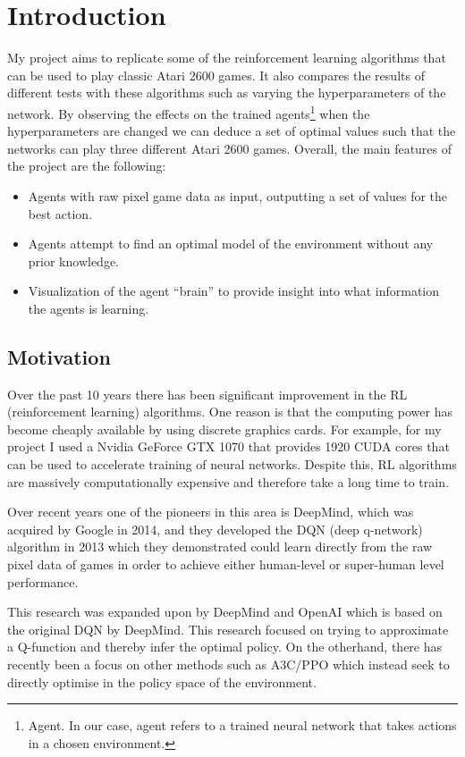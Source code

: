 \chapter{Introduction}
\label{cha:intro}
My project aims to replicate some of the reinforcement learning algorithms that can be used to play classic Atari 2600 games. It also compares the results of different tests with these algorithms such as varying the hyperparameters of the network. By observing the effects on the trained agents\footnote{Agent. In our case, agent refers to a trained neural network that takes actions in a chosen environment.} when the hyperparameters are changed we can deduce a set of optimal values such that the networks can play three different Atari 2600 games. Overall, the main features of the project are the following:
\begin{itemize}
	\item Agents with raw pixel game data as input, outputting a set of values for the best action.
	\item Agents attempt to find an optimal model of the environment without any prior knowledge.
	\item Visualization of the agent ``brain'' to provide insight into what information the agents is learning.
\end{itemize}

\section{Motivation}
\label{sec:moti}
Over the past 10 years there has been significant improvement in the RL (reinforcement learning) algorithms. One reason is that the computing power has become cheaply available by using discrete graphics cards. For example, for my project I used a Nvidia GeForce GTX 1070 that provides 1920 CUDA cores that can be used to accelerate training of neural networks. Despite this, RL algorithms are massively computationally expensive and therefore take a long time to train.

Over recent years one of the pioneers in this area is DeepMind, which was acquired by Google in 2014, and they developed the DQN (deep q-network) algorithm in 2013 which they demonstrated could learn directly from the raw pixel data of games in order to achieve either human-level or super-human level performance.

This research was expanded upon by DeepMind and OpenAI which is based on the original DQN by DeepMind. This research focused on trying to approximate a Q-function and thereby infer the optimal policy. On the otherhand, there has recently been a focus on other methods such as A3C/PPO which instead seek to directly optimise in the policy space of the environment.


